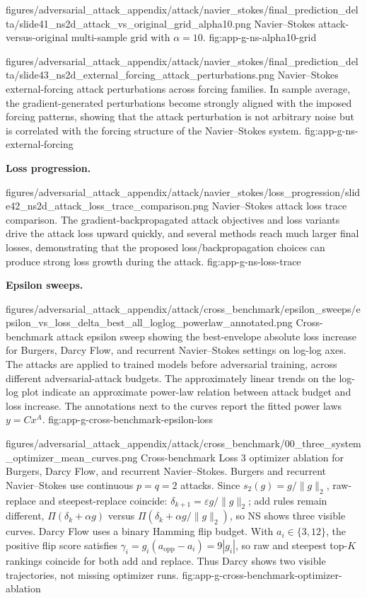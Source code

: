 \documentclass[letterpaper]{article} %
\newcounter{appendixsection}
\newcounter{appendixsubsection}[appendixsection]
\newcounter{appendixdomain}[appendixsubsection]
\begin{document}
\appendixattackfig
  {figures/adversarial_attack_appendix/attack/navier_stokes/final_prediction_delta/slide41_ns2d_attack_vs_original_grid_alpha10.png}
  {Navier--Stokes attack-versus-original multi-sample grid with $\alpha=10$.}
  {fig:app-g-ns-alpha10-grid}

\appendixattackfigfullwidth
  {figures/adversarial_attack_appendix/attack/navier_stokes/final_prediction_delta/slide43_ns2d_external_forcing_attack_perturbations.png}
  {Navier--Stokes external-forcing attack perturbations across forcing
  families. In sample average, the gradient-generated perturbations become
  strongly aligned with the imposed forcing patterns, showing that the attack
  perturbation is not arbitrary noise but is correlated with the forcing
  structure of the Navier--Stokes system.}
  {fig:app-g-ns-external-forcing}

\noindent\textbf{Loss progression.}

\appendixattackfig
  {figures/adversarial_attack_appendix/attack/navier_stokes/loss_progression/slide42_ns2d_attack_loss_trace_comparison.png}
  {Navier--Stokes attack loss trace comparison. The gradient-backpropagated
  attack objectives and loss variants drive the attack loss upward quickly, and
  several methods reach much larger final losses, demonstrating that the
  proposed loss/backpropagation choices can produce strong loss growth during
  the attack.}
  {fig:app-g-ns-loss-trace}

\FloatBarrier
{}

\noindent\textbf{Epsilon sweeps.}

\appendixattackfig
  {figures/adversarial_attack_appendix/attack/cross_benchmark/epsilon_sweeps/epsilon_vs_loss_delta_best_all_loglog_powerlaw_annotated.png}
  {Cross-benchmark attack epsilon sweep showing the best-envelope absolute
  loss increase for Burgers, Darcy Flow, and recurrent Navier--Stokes settings
  on log-log axes. The attacks are applied to trained models before
  adversarial training, across different adversarial-attack budgets. The
  approximately linear trends on the log-log plot indicate an approximate
  power-law relation between attack budget and loss increase. The annotations
  next to the curves report the fitted power laws \(y=Cx^A\).}
  {fig:app-g-cross-benchmark-epsilon-loss}

\appendixattackfig
  {figures/adversarial_attack_appendix/attack/cross_benchmark/00_three_system_optimizer_mean_curves.png}
  {Cross-benchmark Loss 3 optimizer ablation for Burgers, Darcy Flow, and
  recurrent Navier--Stokes. Burgers and recurrent Navier--Stokes use continuous
  \(p=q=2\) attacks. Since \(s_2(g)=g/\|g\|_2\),
  raw-replace and steepest-replace coincide:
  \(\delta_{k+1}=\varepsilon g/\|g\|_2\); add rules remain different,
  \(\Pi(\delta_k+\alpha g)\) versus
  \(\Pi(\delta_k+\alpha g/\|g\|_2)\), so NS shows three visible curves. Darcy
  Flow uses a binary Hamming flip budget. With \(a_i\in\{3,12\}\),
  the positive flip score satisfies
  \(\gamma_i=g_i(a_{\mathrm{opp}}-a_i)=9|g_i|\), so raw and steepest top-\(K\)
  rankings coincide for both add and replace. Thus Darcy shows two visible
  trajectories, not missing optimizer runs.}
  {fig:app-g-cross-benchmark-optimizer-ablation}
\end{document}
